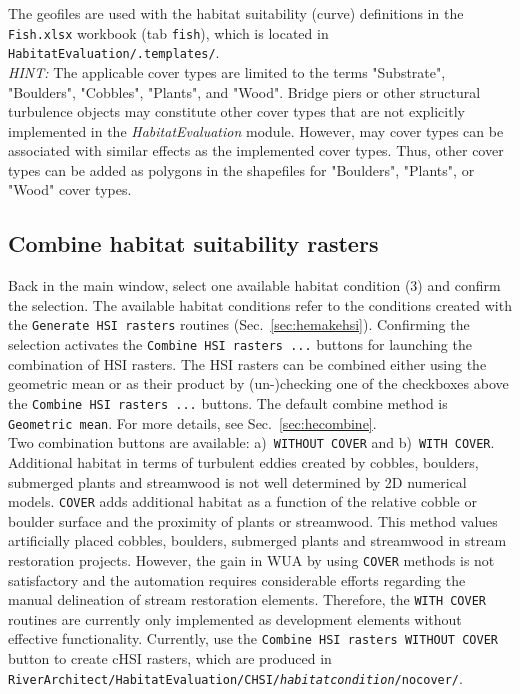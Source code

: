 The geofiles are used with the habitat suitability (curve) definitions in the \texttt{Fish.xlsx} workbook (tab \texttt{fish}), which is located in \texttt{HabitatEvaluation/.templates/}.\\

\textit{HINT:} The applicable cover types are limited to the terms "Substrate", "Boulders", "Cobbles", "Plants", and "Wood". Bridge piers or other structural turbulence objects may constitute other cover types that are not explicitly implemented in the \textit{HabitatEvaluation} module. However, may cover types can be associated with similar effects as the implemented cover types. Thus, other cover types can be added as polygons in the shapefiles for "Boulders", "Plants", or "Wood" cover types.

\subsection{Combine habitat suitability rasters}\label{sec:herunchsi}
Back in the main window, select one available habitat condition (3) and confirm the selection. The available habitat conditions refer to the conditions created with the \texttt{Generate HSI rasters} routines (Sec.~\ref{sec:hemakehsi}). Confirming the selection activates the \texttt{Combine HSI rasters ...} buttons for launching the combination of HSI rasters. The HSI rasters can be combined either using the geometric mean or as their product by (un-)checking one of the checkboxes above the \texttt{Combine HSI rasters ...} buttons. The default combine method is \texttt{Geometric mean}. For more details, see Sec.~\ref{sec:hecombine}.\\
Two combination buttons are available: a)~\texttt{WITHOUT COVER} and b)~\texttt{WITH COVER}. Additional habitat in terms of turbulent eddies created by cobbles, boulders, submerged plants and streamwood is not well determined by 2D numerical models. \texttt{COVER} adds additional habitat as a function of the relative cobble or boulder surface and the proximity of plants or streamwood. This method values artificially placed cobbles, boulders, submerged plants and streamwood in stream restoration projects. However, the gain in WUA by using \texttt{COVER} methods is not satisfactory and the automation requires considerable efforts regarding the manual delineation of stream restoration elements. Therefore, the \texttt{WITH COVER} routines are currently only implemented as development elements without effective functionality. Currently, use the \texttt{Combine HSI rasters WITHOUT COVER} button to create cHSI rasters, which are produced in \texttt{RiverArchitect/HabitatEvaluation/CHSI/\textit{habitat{\myUnderscore}condition}/no{\myUnderscore}cover/}.

